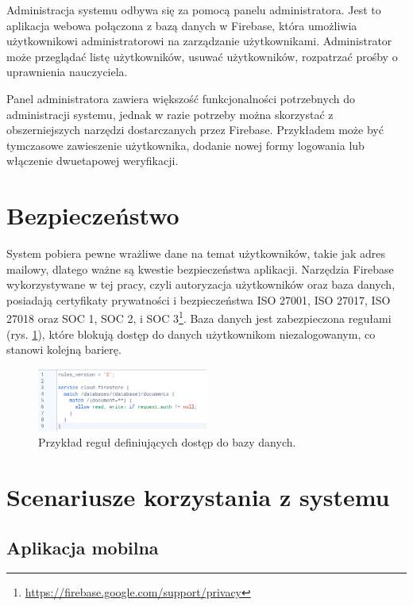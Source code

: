 \documentclass[a4paper,twoside,12pt]{book}
\newcommand{\ksremark}[1]{%
{%
{\color{brickred}{[#1]}}}%
\addcontentsline{rks}{uwagas}{\protect{#1}}%
}
\begin{document}
Administracja systemu odbywa się za pomocą panelu administratora. Jest to aplikacja webowa połączona z bazą danych w Firebase, która umożliwia użytkownikowi  administratorowi na zarządzanie użytkownikami. Administrator może przeglądać listę użytkowników, usuwać użytkowników, rozpatrzać prośby o uprawnienia nauczyciela. 

Panel administratora zawiera większość funkcjonalności potrzebnych do administracji systemu, jednak w razie potrzeby można skorzystać z obszerniejszych narzędzi dostarczanych przez Firebase. Przykładem może być tymczasowe zawieszenie użytkownika, dodanie nowej formy logowania lub włączenie dwuetapowej weryfikacji.

\section{Bezpieczeństwo}

System pobiera pewne wrażliwe dane na temat użytkowników, takie jak adres mailowy, dlatego ważne są kwestie bezpieczeństwa aplikacji. Narzędzia Firebase wykorzystywane w tej pracy, czyli autoryzacja użytkowników oraz baza danych, posiadają certyfikaty prywatności i bezpieczeństwa ISO 27001, ISO 27017, ISO 27018 oraz SOC 1, SOC 2, i SOC 3\footnote{\url{https://firebase.google.com/support/privacy}}. 
Baza danych jest zabezpieczona regułami (rys. \ref{fig:rules}), które blokują dostęp do danych użytkownikom niezalogowanym, co stanowi kolejną barierę.

\begin{figure}[]
\centering
\includegraphics[width=0.5\textwidth]{Firestore}
\caption{Przykład reguł definiujących dostęp do bazy danych.}
\label{fig:rules}
\end{figure}

\section{Scenariusze korzystania z systemu}
\ksremark{zagajenie}
\subsection{Aplikacja mobilna}
\end{document}
